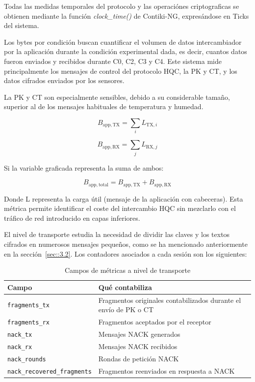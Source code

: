 Todas las medidas temporales del protocolo y las operaciónes criptograficas se obtienen mediante la función \textit{clock\_time()} de 
Contiki-NG, expresándose en Ticks del sistema.

Los bytes por condición buscan cuantificar el volumen de datos intercambiador por la aplicación durante la condición 
experimental dada, es decir, cuantos datos fueron enviados y recibidos durante C0, C2, C3 y C4. Este sistema mide principalmente 
los mensajes de control del protocolo HQC, la PK y CT, y los datos cifrados enviados por los sensores.

La PK y CT son especialmente sensibles, debido a su considerable tamaño, superior al de los mensajes habituales de temperatura y humedad. 

\begin{equation}
  B_{\mathrm{app,TX}} = \sum_{i} L_{\mathrm{TX},i}
\end{equation}

\begin{equation}
  B_{\mathrm{app,RX}} = \sum_{j} L_{\mathrm{RX},j}
\end{equation}

Si la variable graficada representa la suma de ambos:

\begin{equation}
  B_{\mathrm{app,total}} = B_{\mathrm{app,TX}} + B_{\mathrm{app,RX}}
\end{equation}

Donde L representa la carga útil (mensaje de la aplicación con cabeceras). Esta métrica permite identificar el coste del intercambio HQC sin mezclarlo 
con el tráfico de red introducido en capas inferiores. 

El nivel de transporte estudia la necesidad de dividir las claves y los textos cifrados en numerosos mensajes pequeños, como se ha mencionado
anteriormente en la sección~\ref{sec::3.2}. Los contadores asociados a cada sesión son los siguientes:

\begin{table}[!htbp]
    \centering
    \caption{Campos de métricas a nivel de transporte}
    \label{tab:campos_transporte}
    \begin{tabularx}{\textwidth}{l X}
        \toprule
        \textbf{Campo} & \textbf{Qué contabiliza} \\
        \midrule
        \texttt{fragments\_tx} & Fragmentos originales contabilizados durante el envío de PK o CT \\
        \addlinespace
        \texttt{fragments\_rx} & Fragmentos aceptados por el receptor \\
        \addlinespace
        \texttt{nack\_tx} & Mensajes NACK generados \\
        \addlinespace
        \texttt{nack\_rx} & Mensajes NACK recibidos \\
        \addlinespace
        \texttt{nack\_rounds} & Rondas de petición NACK \\
        \addlinespace
        \texttt{nack\_recovered\_fragments} & Fragmentos reenviados en respuesta a NACK \\
        \bottomrule
    \end{tabularx}
\end{table}

